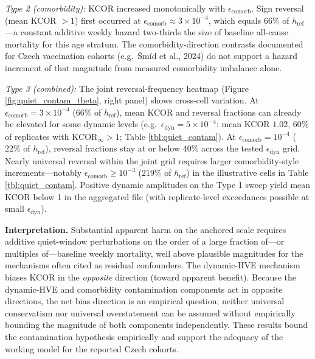 \documentclass[
]{article}
\begin{document}
\emph{Type 2 (comorbidity):} KCOR increased monotonically with
\(\epsilon_{\mathrm{comorb}}\). Sign reversal (mean KCOR \(>1\)) first
occurred at \(\epsilon_{\mathrm{comorb}}\approx3\times10^{-4}\), which
equals \(66\%\) of \(h_{\mathrm{ref}}\)---a constant additive weekly
hazard two-thirds the size of baseline all-cause mortality for this age
stratum. The comorbidity-direction contrasts documented for Czech
vaccination cohorts (e.g.~Šmíd et al., 2024) do not support a hazard
increment of that magnitude from measured comorbidity imbalance alone.

\emph{Type 3 (combined):} The joint reversal-frequency heatmap (Figure
\ref{fig:quiet_contam_theta}, right panel) shows cross-cell variation.
At \(\epsilon_{\mathrm{comorb}}=3\times10^{-4}\) (\(66\%\) of
\(h_{\mathrm{ref}}\)), mean KCOR and reversal fractions can already be
elevated for some dynamic levels
(e.g.~\(\epsilon_{\mathrm{dyn}}=5\times10^{-4}\): mean KCOR \(1.02\),
\(60\%\) of replicates with \(\mathrm{KCOR}_\infty>1\); Table
\ref{tbl:quiet_contam}). At \(\epsilon_{\mathrm{comorb}}=10^{-4}\)
(\(22\%\) of \(h_{\mathrm{ref}}\)), reversal fractions stay at or below
\(40\%\) across the tested \(\epsilon_{\mathrm{dyn}}\) grid. Nearly
universal reversal within the joint grid requires larger
comorbidity-style increments---notably
\(\epsilon_{\mathrm{comorb}}\ge10^{-3}\) (\(219\%\) of
\(h_{\mathrm{ref}}\)) in the illustrative cells in Table
\ref{tbl:quiet_contam}. Positive dynamic amplitudes on the Type 1 sweep
yield mean KCOR below 1 in the aggregated file (with replicate-level
exceedances possible at small \(\epsilon_{\mathrm{dyn}}\)).

\textbf{Interpretation.} Substantial apparent harm on the anchored scale
requires additive quiet-window perturbations on the order of a large
fraction of---or multiples of---baseline weekly mortality, well above
plausible magnitudes for the mechanisms often cited as residual
confounders. The dynamic-HVE mechanism biases KCOR in the
\emph{opposite} direction (toward apparent benefit). Because the
dynamic-HVE and comorbidity contamination components act in opposite
directions, the net bias direction is an empirical question; neither
universal conservatism nor universal overstatement can be assumed
without empirically bounding the magnitude of both components
independently. These results bound the contamination hypothesis
empirically and support the adequacy of the working model for the
reported Czech cohorts.
\end{document}
